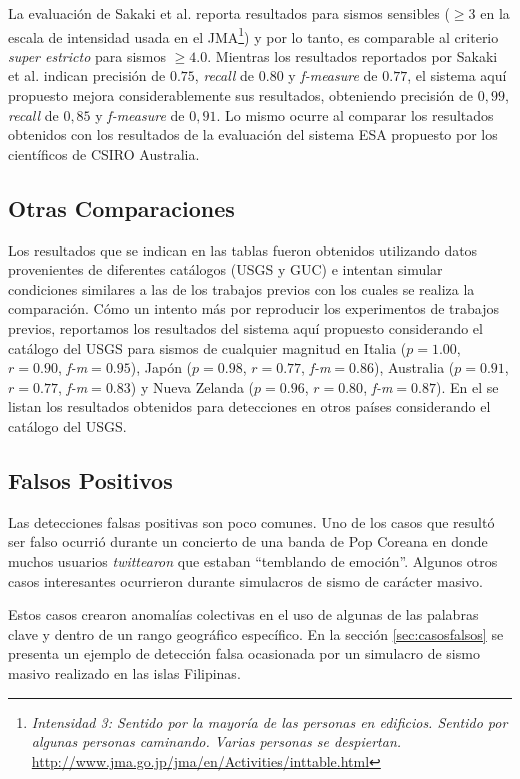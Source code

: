 La evaluación de Sakaki et al. reporta resultados para sismos sensibles ($\geq 3$ en la escala de intensidad usada en el JMA\footnote{{\em Intensidad 3: Sentido por la mayoría de las personas en edificios. Sentido por algunas personas caminando. Varias personas se despiertan.} \url{http://www.jma.go.jp/jma/en/Activities/inttable.html} }) y por lo tanto, es comparable al criterio {\em super estricto} para sismos $\geq 4.0$. Mientras los resultados reportados por Sakaki et al. indican precisión de $0.75$, {\em recall} de $0.80$ y {\em f-measure} de $0.77$, el sistema aquí propuesto mejora considerablemente sus resultados, obteniendo precisión de $0,99$, {\em recall} de $0,85$ y {\em f-measure} de $0,91$. Lo mismo ocurre al comparar los resultados obtenidos con los resultados de la evaluación del sistema ESA propuesto por los científicos de CSIRO Australia.  

\subsection{Otras Comparaciones}

Los resultados que se indican en las tablas fueron obtenidos utilizando datos provenientes de diferentes catálogos (USGS y GUC) e intentan simular condiciones similares a las de los trabajos previos con los cuales se realiza la comparación.
%
Cómo un intento más por reproducir los experimentos de trabajos previos, reportamos los resultados del sistema aquí propuesto considerando el catálogo del USGS para sismos de cualquier magnitud en Italia ($p=1.00$, $r=0.90$, {\em f-m}$=0.95$), Japón ($p=0.98$, $r=0.77$, {\em f-m}$=0.86$), Australia ($p=0.91$, $r=0.77$, {\em f-m}$=0.83$) y Nueva Zelanda ($p=0.96$, $r=0.80$, {\em f-m}$=0.87$).
%
En el  se listan los resultados obtenidos para detecciones en otros países considerando el catálogo del USGS.

 
\subsection{Falsos Positivos}

Las detecciones falsas positivas son poco comunes. Uno de los casos que resultó ser falso ocurrió durante un concierto de una banda de Pop Coreana en donde muchos usuarios \textit{twittearon} que estaban ``temblando de emoción''. Algunos otros casos interesantes ocurrieron durante simulacros de sismo de carácter masivo. 

Estos casos crearon anomalías colectivas en el uso de algunas de las palabras clave y dentro de un rango geográfico específico. En la sección \ref{sec:casosfalsos} se presenta un ejemplo de detección falsa ocasionada por un simulacro de sismo masivo realizado en las islas Filipinas. 

